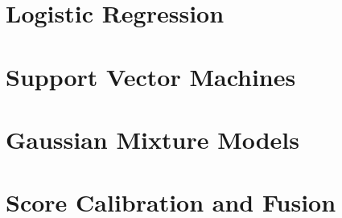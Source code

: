 \documentclass[a4paper,12pt]{article}
\begin{document}
\newpage

\section{Logistic Regression}


\newpage

\section{Support Vector Machines}


\newpage

\section{Gaussian Mixture Models}


\newpage

\section{Score Calibration and Fusion}

\end{document}
